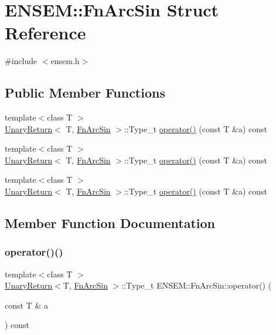 \hypertarget{structENSEM_1_1FnArcSin}{}\section{E\+N\+S\+EM\+:\+:Fn\+Arc\+Sin Struct Reference}
\label{structENSEM_1_1FnArcSin}


{\ttfamily \#include $<$ensem.\+h$>$}

\subsection*{Public Member Functions}
\begin{DoxyCompactItemize}
\item 
{\footnotesize template$<$class T $>$ }\\\mbox{\hyperlink{structENSEM_1_1UnaryReturn}{Unary\+Return}}$<$ T, \mbox{\hyperlink{structENSEM_1_1FnArcSin}{Fn\+Arc\+Sin}} $>$\+::Type\+\_\+t \mbox{\hyperlink{structENSEM_1_1FnArcSin_a2b5019522f59b30d6320947daae37df8}{operator()}} (const T \&a) const
\item 
{\footnotesize template$<$class T $>$ }\\\mbox{\hyperlink{structENSEM_1_1UnaryReturn}{Unary\+Return}}$<$ T, \mbox{\hyperlink{structENSEM_1_1FnArcSin}{Fn\+Arc\+Sin}} $>$\+::Type\+\_\+t \mbox{\hyperlink{structENSEM_1_1FnArcSin_a2b5019522f59b30d6320947daae37df8}{operator()}} (const T \&a) const
\item 
{\footnotesize template$<$class T $>$ }\\\mbox{\hyperlink{structENSEM_1_1UnaryReturn}{Unary\+Return}}$<$ T, \mbox{\hyperlink{structENSEM_1_1FnArcSin}{Fn\+Arc\+Sin}} $>$\+::Type\+\_\+t \mbox{\hyperlink{structENSEM_1_1FnArcSin_a2b5019522f59b30d6320947daae37df8}{operator()}} (const T \&a) const
\end{DoxyCompactItemize}


\subsection{Member Function Documentation}
\mbox{\label{structENSEM_1_1FnArcSin_a2b5019522f59b30d6320947daae37df8}} 
\subsubsection{\texorpdfstring{operator()()}{operator()()}\hspace{0.1cm}{\footnotesize\ttfamily [1/3]}}
{\footnotesize\ttfamily template$<$class T $>$ \\
\mbox{\hyperlink{structENSEM_1_1UnaryReturn}{Unary\+Return}}$<$T, \mbox{\hyperlink{structENSEM_1_1FnArcSin}{Fn\+Arc\+Sin}} $>$\+::Type\+\_\+t E\+N\+S\+E\+M\+::\+Fn\+Arc\+Sin\+::operator() (\begin{DoxyParamCaption}\item[{const T \&}]{a }\end{DoxyParamCaption}) const\hspace{0.3cm}{\ttfamily [inline]}}


